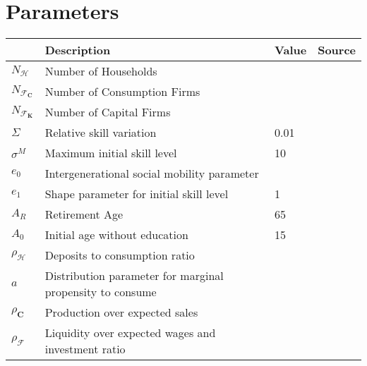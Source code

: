 \documentclass[a4paper, headings=standardclasses]{scrartcl}
\begin{document}

\section{Parameters}

\begin{tabularx}{\linewidth}{lXll}
	\toprule
	                             & Description                                                  & Value  & Source \\
	\midrule
	$N_\mathcal{H}$              & Number of Households                                         &        &        \\
	$N_{\mathcal{F}_\mathbf{C}}$ & Number of Consumption Firms                                  &        &        \\
	$N_{\mathcal{F}_\mathbf{K}}$ & Number of Capital Firms                                      &        &        \\
	$\Sigma$                     & Relative skill variation                                     & 0.01   &        \\
	$\sigma^M$                   & Maximum initial skill level                                  & 10     &        \\
	$e_0$                        & Intergenerational social mobility parameter                  &        &        \\
	$e_1$                        & Shape parameter for initial skill level                      & 1      &        \\
	$A_R$                        & Retirement Age                                               & 65     &        \\
	$A_0$                        & Initial age without education                                & 15     &        \\
	$\rho_\mathcal{H}$           & Deposits to consumption ratio                                &        &        \\
	$a$                          & Distribution parameter for marginal propensity to consume    &        &        \\
	$\rho_\mathbf{C}$            & Production over expected sales                               &        &        \\
	$\rho_\mathcal{F}$           & Liquidity over expected wages and investment ratio           &        &        \\

\end{tabularx}
\end{document}
